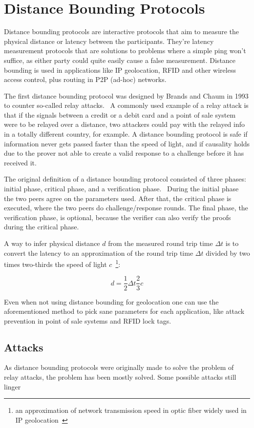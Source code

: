 \section{Distance Bounding Protocols}

Distance bounding protocols are interactive protocols that aim to measure the physical distance or latency between the participants. They're latency measurement protocols that are solutions to problems where a simple ping won't suffice, as either party could quite easily cause a false measurement. Distance bounding is used in applications like IP geolocation, RFID and other wireless access control, plus routing in P2P (ad-hoc) networks.

The first distance bounding protocol was designed by Brands and Chaum in 1993 to counter so-called relay attacks.~\cite{Boureanu_undated-bn, Brands1994-hz} A commonly used example of a relay attack is that if the signals between a credit or a debit card and a point of sale system were to be relayed over a distance, two attackers could pay with the relayed info in a totally different country, for example. A distance bounding protocol is safe if information never gets passed faster than the speed of light, and if causality holds due to the prover not able to create a valid response to a challenge before it has received it.~\cite{Boureanu_undated-bn}

The original definition of a distance bounding protocol consisted of three phases: initial phase, critical phase, and a verification phase.~\cite{Brands1994-hz, Mauw2018-uz} During the initial phase the two peers agree on the parameters used. After that, the critical phase is executed, where the two peers do challenge/response rounds. The final phase, the verification phase, is optional, because the verifier can also verify the proofs during the critical phase.

A way to infer physical distance \(d\) from the measured round trip time \(\Delta t\) is to convert the latency to an approximation of the round trip time \(\Delta t\) divided by two times two-thirds the speed of light \(c\)~\footnote{an approximation of network transmission speed in optic fiber widely used in IP geolocation~\cite{Candela2020-am}}:

\begin{equation*}
  d = \frac{1}{2}\Delta t \frac{2}{3}c
\end{equation*}

Even when not using distance bounding for geolocation one can use the aforementioned method to pick sane parameters for each application, like attack prevention in point of sale systems and RFID lock tags.

\subsection{Attacks}
As distance bounding protocols were originally made to solve the problem of relay attacks, the problem has been mostly solved. Some possible attacks still linger